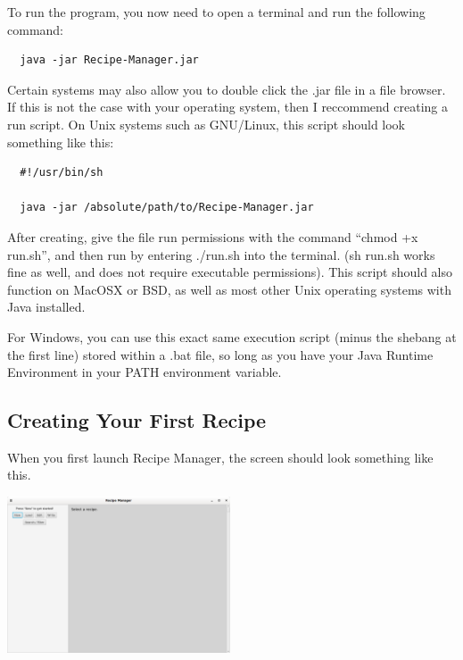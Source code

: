\documentclass{article}
\begin{document}
To run the program, you now need to open a terminal and run the
following command:

\lstset{}
\begin{lstlisting}
  java -jar Recipe-Manager.jar
\end{lstlisting}

Certain systems may also allow you to double click the .jar file in a
file browser. If this is not the case with your operating system, then
I reccommend creating a run script. On Unix systems such as GNU/Linux,
this script should look something like this:

\lstset{language=bash, numbers=left, caption=run.sh}
\begin{lstlisting}
  #!/usr/bin/sh
  
  java -jar /absolute/path/to/Recipe-Manager.jar
\end{lstlisting}

After creating, give the file run permissions with the command ``chmod
+x run.sh'', and then run by entering ./run.sh into the terminal. (sh
run.sh works fine as well, and does not require executable
permissions). This script should also function on MacOSX or BSD, as
well as most other Unix operating systems with Java installed.

For Windows, you can use this exact same execution script (minus the
shebang at the first line) stored within a .bat file, so long as you
have your Java Runtime Environment in your PATH environment
variable.

\subsection{Creating Your First Recipe}

When you first launch Recipe Manager, the screen should look something
like this.

\begin{center}
  \includegraphics[width=250px]{img/emptywindow.png}
\end{center}
\end{document}

